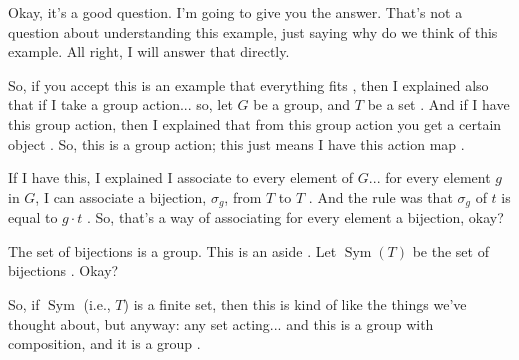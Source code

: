 \begin{speech}[01:05:40 - 01:07:37]
Okay, it's a good question. I'm going to give you the answer. That's not a question about understanding this example, just saying why do we think of this example. All right, I will answer that directly.

So, if you accept this is an example that everything fits , then I explained also that if I take a group action... so, let $G$ be a group, and $T$ be a set . And if I have this group action, then I explained that from this group action you get a certain object . So, this is a group action; this just means I have this action map .

If I have this, I explained I associate to every element of $G$... for every element $g$ in $G$, I can associate a bijection, $\sigma_g$, from $T$ to $T$ . And the rule was that $\sigma_g$ of $t$ is equal to $g \cdot t$ . So, that's a way of associating for every element a bijection, okay?

The set of bijections is a group. This is an aside . Let $\operatorname{Sym}(T)$ be the set of bijections . Okay?

So, if $\operatorname{Sym}$ (i.e., $T$) is a finite set, then this is kind of like the things we've thought about, but anyway: any set acting... and this is a group with composition, and it is a group .
\end{speech}

